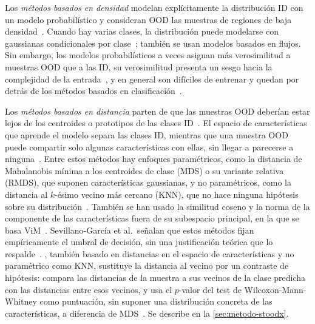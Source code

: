 Los \emph{métodos basados en densidad} modelan explícitamente la distribución ID
con un modelo probabilístico y consideran OOD las muestras de regiones de baja
densidad~\cite{yang2024}. Cuando hay varias clases, la distribución puede
modelarse con gaussianas condicionales por clase~\cite{yang2024,lee2018}; también
se usan modelos basados en flujos. Sin embargo, los modelos probabilísticos a
veces asignan más verosimilitud a muestras OOD que a las ID, su verosimilitud
presenta un sesgo hacia la complejidad de la entrada~\cite{yang2024,serra2020}, y
en general son difíciles de entrenar y quedan por detrás de los métodos basados en
clasificación~\cite{yang2024}.

Los \emph{métodos basados en distancia} parten de que las muestras OOD deberían
estar lejos de los centroides o prototipos de las clases ID~\cite{yang2024}. El
espacio de características que aprende el modelo separa las clases ID, mientras
que una muestra OOD puede compartir solo algunas características con ellas, sin
llegar a parecerse a ninguna~\cite{sevillano2026}. Entre estos métodos hay
enfoques paramétricos, como la distancia de Mahalanobis mínima a los centroides
de clase (MDS) o su variante relativa (RMDS), que suponen características
gaussianas, y no paramétricos, como la distancia al $k$-ésimo vecino más cercano
(KNN), que no hace ninguna hipótesis sobre su
distribución~\cite{sevillano2026,yang2024,lee2018,ren2021,sun2022knn}. También
se han usado la similitud coseno y la norma de la componente de las
características fuera de su subespacio principal, en la que se basa
ViM~\cite{yang2024,wang2022vim}. Sevillano-García et al.\ señalan que estos
métodos fijan empíricamente el umbral de decisión, sin una justificación teórica
que lo respalde~\cite{sevillano2026}. \stoodx, también basado en distancias en
el espacio de características y no paramétrico como KNN, sustituye la distancia
al vecino por un contraste de hipótesis: compara las distancias de la muestra a
sus vecinos de la clase predicha con las distancias entre esos vecinos, y usa el
$p$-valor del test de Wilcoxon-Mann-Whitney como puntuación, sin suponer una
distribución concreta de las características, a diferencia de
MDS~\cite{sevillano2026}. Se describe en la \cref{sec:metodo-stoodx}.


